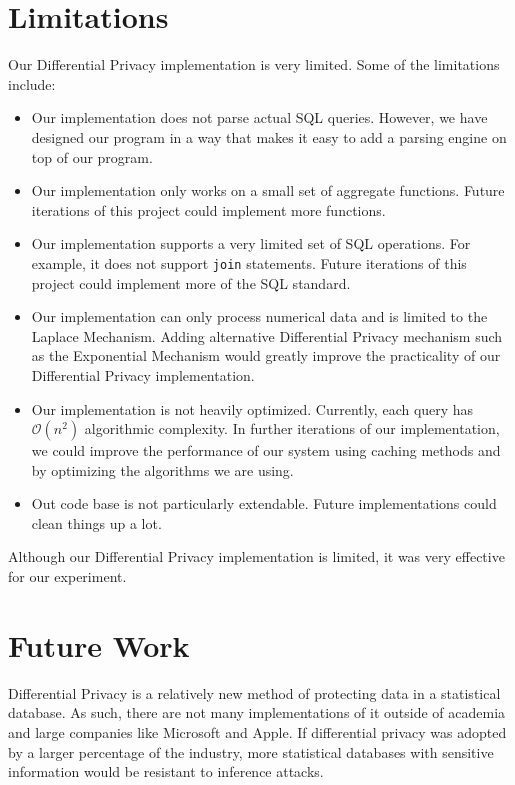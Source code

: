 \documentclass[conference,11pt]{IEEEtran}
\begin{document}
\section{Limitations}\label{sec:limitations}
Our Differential Privacy implementation is very limited. Some of the limitations
include:
\begin{itemize}
    \item Our implementation does not parse actual SQL queries. However, we
        have designed our program in a way that makes it easy to add a parsing
        engine on top of our program.
    \item Our implementation only works on a small set of aggregate functions.
        Future iterations of this project could implement more functions.
    \item Our implementation supports a very limited set of SQL operations. For
        example, it does not support \texttt{join} statements.  Future
        iterations of this project could implement more of the SQL standard.
    \item Our implementation can only process numerical data and is limited to
        the Laplace Mechanism. Adding alternative Differential Privacy mechanism
        such as the Exponential Mechanism would greatly improve the practicality
        of our Differential Privacy implementation.
    \item Our implementation is not heavily optimized. Currently, each query has
        $\mathcal{O}(n^2)$ algorithmic complexity. In further iterations of our
        implementation, we could improve the performance of our system using
        caching methods and by optimizing the algorithms we are using.
   \item Out code base is not particularly extendable. Future implementations
        could clean things up a lot.
\end{itemize}

Although our Differential Privacy implementation is limited, it was very
effective for our experiment.

\section{Future Work}\label{sec:future-work}
Differential Privacy is a relatively new method of protecting data in a
statistical database. As such, there are not many implementations of it outside
of academia and large companies like Microsoft and Apple. If differential
privacy was adopted by a larger percentage of the industry, more statistical
databases with sensitive information would be resistant to inference attacks.
\end{document}
